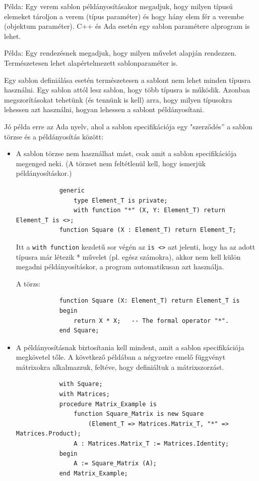 \documentclass[margin=0px]{article}
\begin{document}
	Példa: Egy verem sablon példányosításakor megadjuk, hogy milyen típusú elemeket tároljon a verem (típus
	paraméter) és hogy hány elem fér a verembe (objektum paraméter).
	C++ és Ada esetén egy sablon paramétere alprogram is lehet.
		
	Példa: Egy rendezésnek megadjuk, hogy milyen művelet alapján rendezzen.
	Természetesen lehet alapértelmezett sablonparaméter is.
	
	Egy sablon definiálása esetén természetesen a sablont nem lehet minden típusra használni. Egy sablon attól
	lesz sablon, hogy több típusra is működik. Azonban megszorításokat tehetünk (és tennünk is kell) arra, hogy
	milyen típusokra lehessen azt használni, hogyan lehessen a sablont példányosítani.

	Jó példa erre az Ada nyelv, ahol a sablon specifikációja egy "szerződés” a sablon törzse és a példányosítás
	között:
	
	\begin{itemize}
		\item	A sablon törzse nem használhat mást, csak amit a sablon specifikációja megenged neki. (A törzset
		nem feltétlenül kell, hogy ismerjük példányosításkor.)
		\begin{verbatim}
			generic
			    type Element_T is private;
			    with function "*" (X, Y: Element_T) return Element_T is <>;
			function Square (X : Element_T) return Element_T;
		\end{verbatim}
		Itt a \texttt{with function} kezdetű sor végén az \texttt{is <>} azt jelenti, hogy ha az adott típusra már létezik *
		művelet (pl. egész számokra), akkor nem kell külön megadni példányosításkor, a program automatikusan azt használja.
		
		A törzs:
		\begin{verbatim}
			function Square (X: Element_T) return Element_T is
			begin
			    return X * X;   -- The formal operator "*".
			end Square;
		\end{verbatim}
		
		\item	A példányosításnak biztosítania kell mindent, amit a sablon specifikációja megkövetel tőle.
		A következő példában a négyzetre emelő függvényt mátrixokra alkalmazzuk, feltéve, hogy definiáltuk a
		mátrixszorzást.
		\begin{verbatim}
			with Square;
			with Matrices;
			procedure Matrix_Example is
			    function Square_Matrix is new Square
			        (Element_T => Matrices.Matrix_T, "*" => Matrices.Product);
			    A : Matrices.Matrix_T := Matrices.Identity;
			begin
			    A := Square_Matrix (A);
			end Matrix_Example;
		\end{verbatim}
	\end{itemize}
\end{document}
